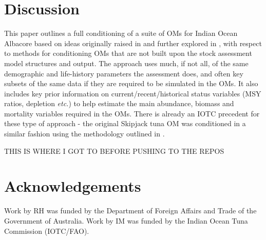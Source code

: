 \documentclass[11pt]{article}
\begin{document}
\section{Discussion}

This paper outlines a full conditioning of a suite of OMs for Indian Ocean Albacore based on ideas originally raised in \cite{om21} and further explored in \cite{om23a}, with respect to methods for conditioning OMs that are not built upon the stock assessment model structures and output. The approach uses much, if not all, of the same demographic and life-history parameters the assessment does, and often key subsets of the same data if they are required to be simulated in the OMs. It also includes key prior information on current/recent/historical status variables (MSY ratios, depletion \textit{etc.}) to help estimate the main abundance, biomass and mortality variables required in the OMs. There is already an IOTC precedent for these type of approach - the original Skipjack tuna OM was conditioned in a similar fashion \cite{skj} using the methodology outlined in \cite{fst}.

THIS IS WHERE I GOT TO BEFORE PUSHING TO THE REPOS

\section{Acknowledgements}

Work by RH was funded by the Department of Foreign Affairs and Trade of the Government of Australia. Work by IM was funded by the Indian Ocean Tuna Commission (IOTC/FAO).
\end{document}
